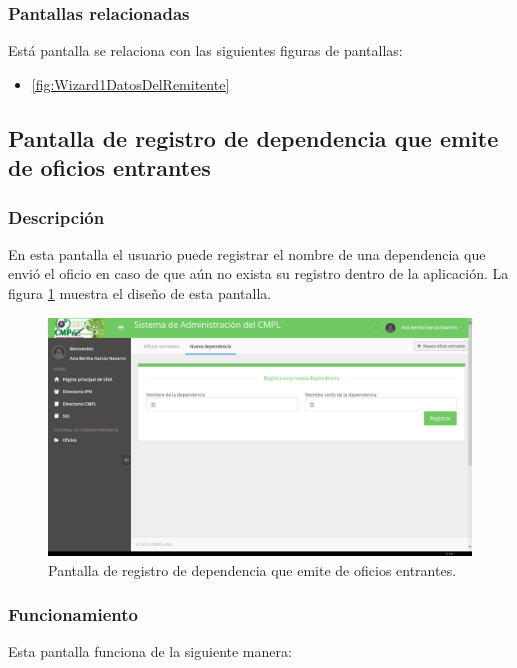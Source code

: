 \subsubsection{Pantallas relacionadas}
Está pantalla se relaciona con las siguientes figuras de pantallas:
	\begin{itemize}
		\item \ref{fig:Wizard1DatosDelRemitente}
	\end{itemize}

\subsection{Pantalla de registro de dependencia que emite de oficios entrantes}
\subsubsection{Descripción}
	En esta pantalla el usuario puede registrar el nombre de una dependencia que envió el oficio en caso de que aún no exista su registro dentro de la aplicación. La figura \ref{fig:NuevaDependencia} muestra el diseño de esta pantalla.		
		
	\begin{figure}[htbp!]
		\centering
			\includegraphics[width=1\textwidth]{Pantallas/NuevaDependencia.png}
		\caption{Pantalla de registro de dependencia que emite de oficios entrantes.}
		\label{fig:NuevaDependencia}
	\end{figure}

\subsubsection{Funcionamiento}
	Esta pantalla funciona de la siguiente manera:
	
